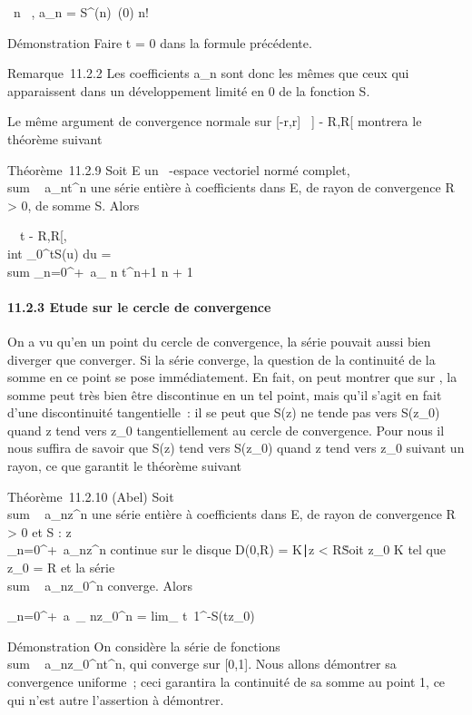 \documentclass[]{article}
\begin{document}
\forall~n \in {}~, a\_n = S^(n)~(0)
\over n!

Démonstration Faire t = 0 dans la formule précédente.

Remarque~11.2.2 Les coefficients a\_n sont donc les mêmes que
ceux qui apparaissent dans un développement limité en 0 de la fonction
S.

Le même argument de convergence normale sur {[}-r,r{]} \subset~{]} - R,R{[}
montrera le théorème suivant

Théorème~11.2.9 Soit E un ~-espace vectoriel normé complet,
\\sum ~
a\_nt^n une série entière à coefficients dans E, de
rayon de convergence R \textgreater{} 0, de somme S. Alors

\forall~~t \in{]} - R,R{[}, \\int
 \_0^tS(u) du = \\sum
\_n=0^+\infty~a\_ n t^n+1
\over n + 1

\paragraph{11.2.3 Etude sur le cercle de convergence}

On a vu qu'en un point du cercle de convergence, la série pouvait aussi
bien diverger que converger. Si la série converge, la question de la
continuité de la somme en ce point se pose immédiatement. En fait, on
peut montrer que sur , la somme peut très bien être discontinue en un
tel point, mais qu'il s'agit en fait d'une discontinuité tangentielle~:
il se peut que S(z) ne tende pas vers S(z\_0) quand z tend vers
z\_0 tangentiellement au cercle de convergence. Pour nous il
nous suffira de savoir que S(z) tend vers S(z\_0) quand z tend
vers z\_0 suivant un rayon, ce que garantit le théorème suivant

Théorème~11.2.10 (Abel) Soit
\\sum ~
a\_nz^n une série entière à coefficients dans E, de
rayon de convergence R \textgreater{} 0 et S :
z\mapsto~\\\sum
 \_n=0^+\infty~a\_nz^n continue sur le
disque D(0,R) = \z \in
K∣\textbar{}z\textbar{} \textless{}
R\. Soit z\_0 \in K tel que
\textbar{}z\_0\textbar{} = R et la série
\\sum ~
a\_nz\_0^n converge. Alors

\sum \_n=0^+\infty~a~\_
nz\_0^n = lim\_
t\rightarrow~1^-S(tz\_0)

Démonstration On considère la série de fonctions
\\sum ~
a\_nz\_0^nt^n, qui converge sur
{[}0,1{]}. Nous allons démontrer sa convergence uniforme~; ceci
garantira la continuité de sa somme au point 1, ce qui n'est autre
l'assertion à démontrer.
\end{document}
